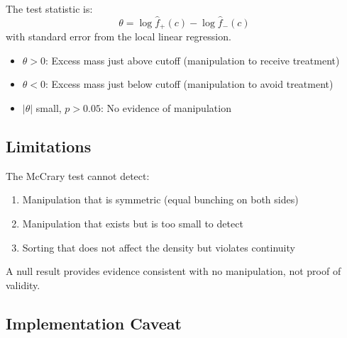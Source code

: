 The test statistic is:
\begin{equation}
    \theta = \log \hat{f}_+(c) - \log \hat{f}_-(c)
\end{equation}
with standard error from the local linear regression.

\begin{remark}[Interpretation]
\begin{itemize}
    \item $\theta > 0$: Excess mass just above cutoff (manipulation to receive treatment)
    \item $\theta < 0$: Excess mass just below cutoff (manipulation to avoid treatment)
    \item $|\theta|$ small, $p > 0.05$: No evidence of manipulation
\end{itemize}
\end{remark}

\subsection{Limitations}

\begin{remark}
The McCrary test cannot detect:
\begin{enumerate}
    \item Manipulation that is symmetric (equal bunching on both sides)
    \item Manipulation that exists but is too small to detect
    \item Sorting that does not affect the density but violates continuity
\end{enumerate}
A null result provides evidence consistent with no manipulation, not proof of validity.
\end{remark}

\subsection{Implementation Caveat}

